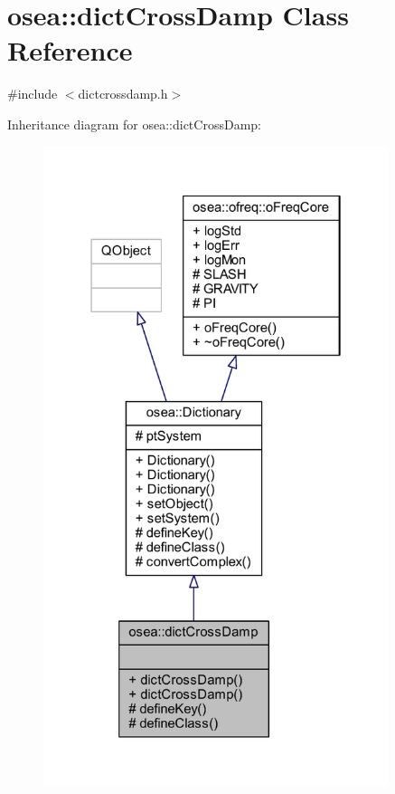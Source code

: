 \hypertarget{classosea_1_1dict_cross_damp}{\section{osea\-:\-:dict\-Cross\-Damp Class Reference}
\label{classosea_1_1dict_cross_damp}
}


{\ttfamily \#include $<$dictcrossdamp.\-h$>$}



Inheritance diagram for osea\-:\-:dict\-Cross\-Damp\-:
\nopagebreak
\begin{figure}[H]
\begin{center}
\leavevmode
\includegraphics[width=286pt]{classosea_1_1dict_cross_damp__inherit__graph}
\end{center}
\end{figure}
